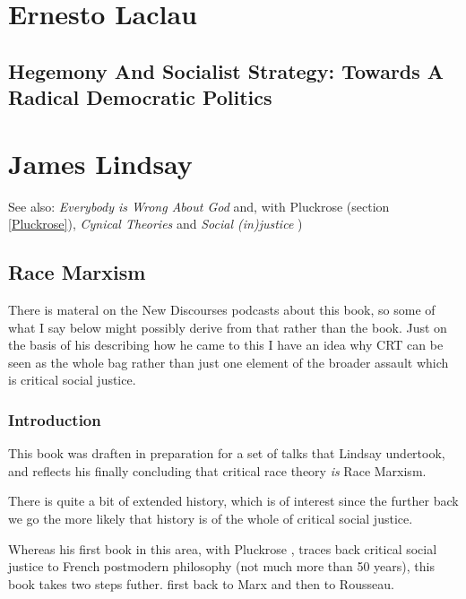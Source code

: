 \documentclass[10pt,titlepage]{book}
\begin{document}
\section{Ernesto Laclau}

\subsection{Hegemony And Socialist Strategy: Towards A Radical Democratic Politics \cite{laclau-hegsoc}}

\section{James Lindsay}

See also:  \emph{Everybody is Wrong About God} \cite{lindsay-everybody}
and, with Pluckrose (section \ref{Pluckrose}),
\emph{Cynical Theories} \cite{pluckrose-cynical}
and \emph{Social (in)justice} \cite{pluckrose-socinj})

\subsection{Race Marxism \cite{lindsay-racemarx}}

There is materal on the New Discourses podcasts \cite{lindsay-discourses} about this book, so some of what I say below might possibly derive from that rather than the book.
Just on the basis of his describing how he came to this I have an idea why CRT can be seen as the whole bag rather than just one element of the broader assault which is critical social justice.

\subsubsection{Introduction}

This book was draften in preparation for a set of talks that Lindsay undertook, and reflects his finally concluding that critical race theory \emph{is} Race Marxism.

There is quite a bit of extended history, which is of interest since the further back we go the more likely that history is of the whole of critical social justice.

Whereas his first book in this area, with Pluckrose \cite{pluckrose-cynical}, traces back critical social justice to French postmodern philosophy (not much more than 50 years), this book takes two steps futher. first back to Marx and then to Rousseau.
\end{document}
